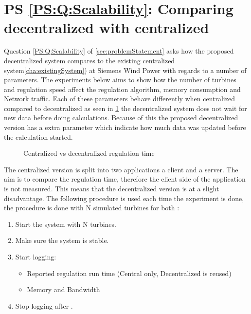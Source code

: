 \section{PS \ref{PS:Q:Scalability}: Comparing decentralized with centralized}
Question \ref{PS:Q:Scalability} of \cref{sec:problemStatement} asks how the proposed decentralized system compares to the existing centralized system\cref{cha:existingSystem}) at Siemens Wind Power with regards to a number of parameters.
The experiments below aims to show how the number of turbines and regulation speed affect the regulation algorithm, memory consumption and Network traffic.
Each of these parameters behave differently when centralized compared to decentralized as seen in \cref{fig:timingCentralVSDecentral} the decentralized system does not wait for new data before doing calculations. Because of this the proposed decentralized version has a extra parameter which indicate how much data was updated before the calculation started.

\begin{figure}[b]
	\centering
	{}
	
	\newline
	
	{}
	
	\caption{Centralized vs decentralized regulation time}
	\label{fig:timingCentralVSDecentral}
\end{figure}

	The centralized version is split into two applications a client and a server.
	The aim is to compare the regulation time, therefore the client side of the application is not measured. This means that the decentralized version is at a slight disadvantage.
	The following procedure is used each time the experiment is done, the procedure is done with N simulated turbines for both :

\begin{minipage}{\textwidth}
	\begin{enumerate}
		\item Start the system with N turbines.
		\item Make sure the system is stable.
		\item Start logging:
		\begin{itemize}
			\item Reported regulation run time (Central only, Decentralized is reused)
			\item Memory and Bandwidth
		\end{itemize}
		\item Stop logging after \experiemntRunTime.
		\end{enumerate}
\end{minipage}
